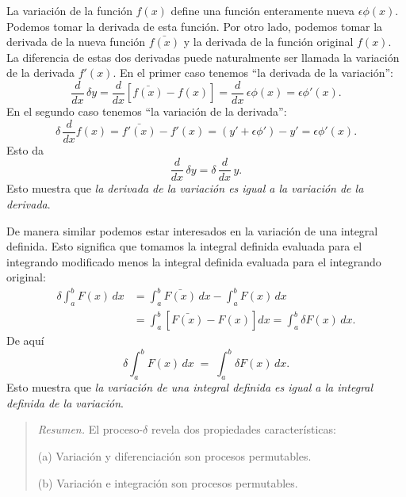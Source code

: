 \documentclass[12pt,a4paper]{book}
\begin{document}
La variación de la función $f(x)$ define una función enteramente nueva $\epsilon\phi(x)$. Podemos tomar la derivada de esta función. Por otro lado, podemos tomar la derivada de la nueva función $\bar{f(x)}$ y la derivada de la función original $f(x)$. La diferencia de estas dos derivadas puede naturalmente ser llamada la variación de la derivada $f'(x)$. En el primer caso tenemos ``la derivada de la variación'':
\begin{equation}
\frac{d}{dx} \, \delta y = \frac{d}{dx}\left[\bar{f(x)} - f(x)\right] = \frac{d}{dx} \, \epsilon\phi(x) = \epsilon\phi'(x). \tag{29.1}
\end{equation}
En el segundo caso tenemos ``la variación de la derivada'':
\begin{equation}
\delta \, \frac{d}{dx} f(x) = \bar{f'(x)} - f'(x) = (y' + \epsilon\phi') - y' = \epsilon\phi'(x). \tag{29.2}
\end{equation}
Esto da
\begin{equation}
\frac{d}{dx} \, \delta y = \delta \, \frac{d}{dx} \, y. \tag{29.3}
\end{equation}
Esto muestra que \textit{la derivada de la variación es igual a la variación de la derivada}.

De manera similar podemos estar interesados en la variación de una integral definida. Esto significa que tomamos la integral definida evaluada para el integrando modificado menos la integral definida evaluada para el integrando original:
\begin{equation}
\begin{aligned}
\delta \int_a^b F(x) \, dx &= \int_a^b \bar{F(x)} \, dx - \int_a^b F(x) \, dx \\
&= \int_a^b \left[\bar{F(x)} - F(x)\right] dx = \int_a^b \delta F(x) \, dx.
\end{aligned} \tag{29.4}
\end{equation}
De aquí
\begin{equation}
\delta \int_a^b F(x) \, dx \;=\; \int_a^b \delta F(x) \, dx. \tag{29.5}
\end{equation}
Esto muestra que \textit{la variación de una integral definida es igual a la integral definida de la variación}.

\begin{quote}
\textit{Resumen.} El proceso-$\delta$ revela dos propiedades características:

(a) Variación y diferenciación son procesos permutables.

(b) Variación e integración son procesos permutables.
\end{quote}
\end{document}
